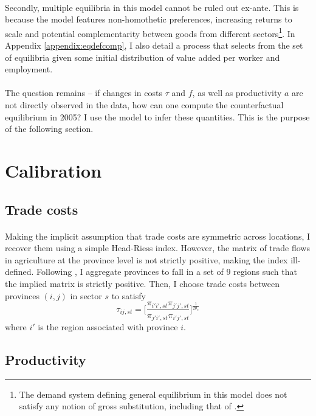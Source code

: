 \documentclass[]{article}
\theoremstyle{plain}
\begin{document}
\paragraph*{}
Secondly, multiple equilibria in this model cannot be ruled out ex-ante. This is because the model features non-homothetic preferences, increasing returns to scale and potential complementarity between goods from different sectors\footnote{The demand system defining general equilibrium in this model does not satisfy any notion of gross substitution, including that of  \cite{connectedsubstitutes}.}. In Appendix \ref{appendix:eqdefcomp}, I also detail a process that selects from the set of equilibria given some initial distribution of value added per worker and employment.
\paragraph*{}
 The question remains -- if changes in costs $\tau$ and $f$, as well as productivity $a$ are not directly observed in the data, how can one compute the counterfactual equilibrium in 2005? I use the model to infer these quantities. This is the purpose of the following section.
 
\section{Calibration}\label{sect:calibration}
\subsection*{Trade costs}
\paragraph*{}
Making the implicit assumption that trade costs are symmetric across locations, I recover them using a simple Head-Riess index. However, the matrix of trade flows in agriculture at the province level is not strictly positive, making the index ill-defined. Following \cite{tombezhu}, I aggregate provinces to fall in a set of 9 regions such that the implied matrix is strictly positive. Then, I choose trade costs between provinces $(i, j)$ in sector $s$ to satisfy
\begin{equation}
	\tau_{ij, st} = \bigg[\frac{\pi_{i'i', st}\pi_{j'j', st}}{\pi_{j'i', st}\pi_{i'j', st}}\bigg]^{\frac{1}{2\theta_{s}}}
\end{equation}
where $i'$ is the region associated with province $i$. 
\subsection*{Productivity}
\end{document}
